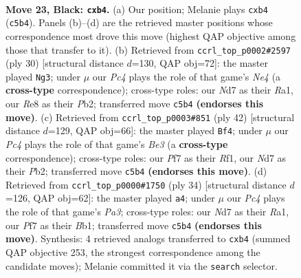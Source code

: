 \documentclass[11pt]{article}
\begin{document}
\clearpage

\begin{figure}[p]\centering
\begin{subfigure}{0.46\textwidth}\centering
\resizebox{\linewidth}{!}{%
\newchessgame
\chessboard[
  setfen={rn2r3/p2nqpkP/3p1b2/1RpP2p1/1P2P1P1/2NQ4/4N3/2B1K2R b K - 0 23},
  showmover=false,
  pgfstyle=straightmove, color=movearrow, markmove={c5-b4}
]}
\caption{}
\end{subfigure}\hfill
\begin{subfigure}{0.46\textwidth}\centering
\resizebox{\linewidth}{!}{%
\newchessgame
\chessboard[
  setfen={r3r1k1/pbbnqppp/2p2n2/1p6/3PN3/P2B4/1PQN1PPP/R1BR2K1 w - - 1 16},
  showmover=false,
  pgfstyle=straightmove, color=movearrow, markmove={e4-g3}
]}
\caption{}
\end{subfigure}
\\[4pt]
\begin{subfigure}{0.46\textwidth}\centering
\resizebox{\linewidth}{!}{%
\newchessgame
\chessboard[
  setfen={3qr3/2n2pbk/r2p1n1p/2p2P2/P7/1RN1BN1P/1P1Q2P1/5RK1 w - - 3 22},
  showmover=false,
  pgfstyle=straightmove, color=movearrow, markmove={e3-f4}
]}
\caption{}
\end{subfigure}\hfill
\begin{subfigure}{0.46\textwidth}\centering
\resizebox{\linewidth}{!}{%
\newchessgame
\chessboard[
  setfen={5r1k/1pqb2pp/2np1n2/r3pP2/8/P4N2/1BQR1PPP/RB4K1 w - - 1 18},
  showmover=false,
  pgfstyle=straightmove, color=movearrow, markmove={a3-a4}
]}
\caption{}
\end{subfigure}
\caption{\textbf{Move 23, Black: \texttt{cxb4}.} (a) Our position; Melanie plays \texttt{cxb4} (\texttt{c5b4}). Panels (b)--(d) are the retrieved master positions whose correspondence most drove this move (highest QAP objective among those that transfer to it). (b) Retrieved from \texttt{ccrl\_top\_p0002\#2597} (ply 30) [structural distance $d$=130, QAP obj=72]: the master played \texttt{Ng3}; under $\mu$ our \emph{Pc4} plays the role of that game's \emph{Ne4} (a \textbf{cross-type} correspondence); cross-type roles: our \emph{N}d7 as their \emph{R}a1, our \emph{R}e8 as their \emph{P}b2; transferred move \texttt{c5b4} \textbf{(endorses this move)}. (c) Retrieved from \texttt{ccrl\_top\_p0003\#851} (ply 42) [structural distance $d$=129, QAP obj=66]: the master played \texttt{Bf4}; under $\mu$ our \emph{Pc4} plays the role of that game's \emph{Be3} (a \textbf{cross-type} correspondence); cross-type roles: our \emph{P}f7 as their \emph{R}f1, our \emph{N}d7 as their \emph{P}b2; transferred move \texttt{c5b4} \textbf{(endorses this move)}. (d) Retrieved from \texttt{ccrl\_top\_p0000\#1750} (ply 34) [structural distance $d$=126, QAP obj=62]: the master played \texttt{a4}; under $\mu$ our \emph{Pc4} plays the role of that game's \emph{Pa3}; cross-type roles: our \emph{N}d7 as their \emph{R}a1, our \emph{P}f7 as their \emph{B}b1; transferred move \texttt{c5b4} \textbf{(endorses this move)}. Synthesis: 4 retrieved analogs transferred to \texttt{cxb4} (summed QAP objective 253, the strongest correspondence among the candidate moves); Melanie committed it via the \texttt{search} selector.}
\label{fig:thought-m45}
\end{figure}
\end{document}
